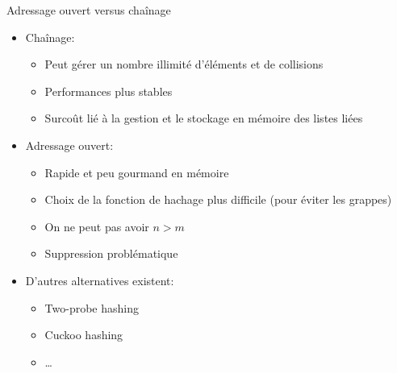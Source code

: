 \begin{frame}{Adressage ouvert versus chaînage}
\begin{itemize}
\item Chaînage:
\begin{itemize}
\item Peut gérer un nombre illimité d'éléments et de collisions
\item Performances plus stables
\item Surcoût lié à la gestion et le stockage en mémoire des listes liées
\end{itemize}
\item Adressage ouvert:
\begin{itemize}
\item Rapide et peu gourmand en mémoire
\item Choix de la fonction de hachage plus difficile (pour éviter les grappes)
\item On ne peut pas avoir $n>m$
\item Suppression problématique
\end{itemize}

\bigskip

\item D'autres alternatives existent:
\begin{itemize}
\item Two-probe hashing
\item Cuckoo hashing
\item \ldots
\end{itemize}
\end{itemize}


\end{frame}

